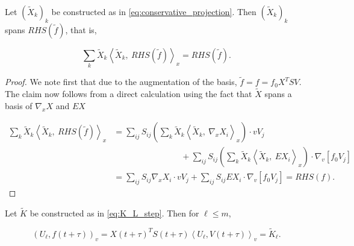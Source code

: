 \begin{lemma}\label{lem:conservation}
    Let $\left( \widetilde{ X }_k \right)_k$ be constructed as in 
    \ref{eq:conservative_projection}. Then
    $\left( \widetilde{ X }_k \right)_k$ spans $RHS(\widetilde{ f })$, 
    that is, 

    \begin{equation}
        \sum_k \widetilde{ X }_k \left\langle 
            \widetilde{ X }_k,\ RHS(\widetilde{ f }) 
        \right\rangle_x
        = RHS(\widetilde{ f }) . 
    \end{equation}
\end{lemma}

\begin{proof}
    We note first that due to the augmentation of the basis, 
    $\widetilde{ f } = f = f_0 X^T S V$. 
    The claim now follows from a direct calculation using the fact that 
    $\widetilde{ X }$ spans a basis of $\nabla_x X$ and $E X$

    \begin{equation}
        \begin{split}
            \sum_k \widetilde{ X }_k \left\langle 
                \widetilde{ X }_k,\ 
                RHS(\widetilde{ f })
             \right\rangle_x
            &= \sum_{i j} S_{i j} \left( \sum_k \widetilde{ X }_k \left\langle 
                \widetilde{ X }_k,\ 
                \nabla_x X_i
             \right\rangle_x \right) \cdot v V_j \\ 
            &\quad\quad\quad\quad\quad\quad\quad\quad
             + \sum_{i j} S_{i j} \left( \sum_k \widetilde{ X }_k \left\langle 
                \widetilde{ X }_k,\ 
                E X_i
              \right\rangle_x \right) \cdot \nabla_v \left[ f_0 V_j \right] \\ 
            &= \sum_{i j} S_{i j} \nabla_x X_i \cdot v V_j 
                + \sum_{i j} S_{i j} E X_i \cdot \nabla_v \left[ f_0 V_j \right]
            = RHS(f) . 
        \end{split}
    \end{equation}
\end{proof}

\begin{lemma}
    Let $\widetilde{ K }$ be constructed as in \ref{eq:K_L_step}. Then 
    for $\ell \leq m$, 

    \begin{equation}
        \left( U_\ell, f (t + \tau) \right)_v
        = X(t + \tau)^T S(t + \tau) \left\langle U_\ell, V(t + \tau) \right\rangle_v
        = \widetilde{ K }_\ell . 
    \end{equation}
\end{lemma}

